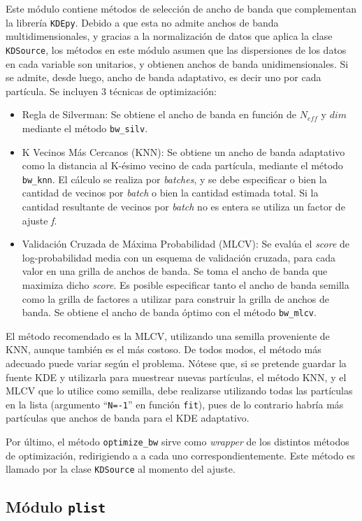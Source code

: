 Este módulo contiene métodos de selección de ancho de banda que complementan la librería \verb|KDEpy|. Debido a que esta no admite anchos de banda multidimensionales, y gracias a la normalización de datos que aplica la clase \verb|KDSource|, los métodos en este módulo asumen que las dispersiones de los datos en cada variable son unitarios, y obtienen anchos de banda unidimensionales. Si se admite, desde luego, ancho de banda adaptativo, es decir uno por cada partícula. Se incluyen 3 técnicas de optimización:
\begin{itemize}
	\item Regla de Silverman: Se obtiene el ancho de banda en función de $N_{eff}$ y $dim$ mediante el método \verb|bw_silv|.
	\item K Vecinos Más Cercanos (KNN): Se obtiene un ancho de banda adaptativo como la distancia al K-ésimo vecino de cada partícula, mediante el método \verb|bw_knn|. El cálculo se realiza por \emph{batches}, y se debe especificar o bien la cantidad de vecinos por \emph{batch} o bien la cantidad estimada total. Si la cantidad resultante de vecinos por \emph{batch} no es entera se utiliza un factor de ajuste \emph{f}.
	\item Validación Cruzada de Máxima Probabilidad (MLCV): Se evalúa el \emph{score} de log-probabilidad media con un esquema de validación cruzada, para cada valor en una grilla de anchos de banda. Se toma el ancho de banda que maximiza dicho \emph{score}. Es posible especificar tanto el ancho de banda semilla como la grilla de factores a utilizar para construir la grilla de anchos de banda. Se obtiene el ancho de banda óptimo con el método \verb|bw_mlcv|.
\end{itemize}
El método recomendado es la MLCV, utilizando una semilla proveniente de KNN, aunque también es el más costoso. De todos modos, el método más adecuado puede variar según el problema. Nótese que, si se pretende guardar la fuente KDE y utilizarla para muestrear nuevas partículas, el método KNN, y el MLCV que lo utilice como semilla, debe realizarse utilizando todas las partículas en la lista (argumento ``\verb|N=-1|'' en función \verb|fit|), pues de lo contrario habría más partículas que anchos de banda para el KDE adaptativo.

Por último, el método \verb|optimize_bw| sirve como \emph{wrapper} de los distintos métodos de optimización, redirigiendo a a cada uno correspondientemente. Este método es llamado por la clase \verb|KDSource| al momento del ajuste.


\subsection{Módulo \texttt{plist}}

